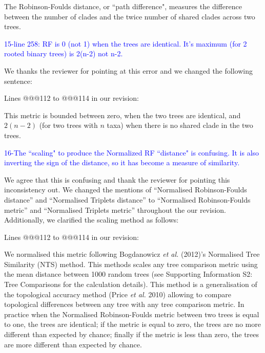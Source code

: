 \documentclass[11pt]{letter}
\begin{document}
\begin{letter}{}
\hfill\begin{minipage}{\dimexpr\textwidth-1cm}
The Robinson-Foulds distance, or ``path difference", measures the difference between the number of clades and the twice number of shared clades across two trees.
\end{minipage}


\textcolor{blue}{15-line 258: RF is 0 (not 1) when the trees are identical. It's maximum (for 2 rooted binary trees) is 2(n-2) not n-2.}

We thanks the reviewer for pointing at this error and we changed the following sentence:

Lines @@@112 to @@@114 in our revision:

\hfill\begin{minipage}{\dimexpr\textwidth-1cm}
This metric is bounded between zero, when the two trees are identical, and $2(n-2)$ (for two trees with $n$ taxa) when there is no shared clade in the two trees.
\end{minipage}



\textcolor{blue}{16-The ``scaling" to produce the Normalized RF ``distance" is confusing. It is also inverting the sign of the distance, so it has become a measure of similarity.}

We agree that this is confusing and thank the reviewer for pointing this inconsistency out. We changed the mentions of ``Normalised Robinson-Foulds distance'' and ``Normalised Triplets distance'' to ``Normalised Robinson-Foulds metric'' and ``Normalised Triplets metric'' throughout the our revision. Additionally, we clarified the scaling method as follows:

Lines @@@112 to @@@114 in our revision:

\hfill\begin{minipage}{\dimexpr\textwidth-1cm}
We normalised this metric following Bogdanowicz \textit{et al.} (2012)'s Normalised Tree Similarity (NTS) method. This methods scales %
any tree comparison metric using the mean distance between 1000 random trees (see Supporting Information S2: Tree Comparisons for the calculation details). This method is a generalisation of the topological accuracy method (Price \textit{et al.} 2010) allowing to compare topological differences between any tree with any tree comparison metric. In practice when the Normalised Robinson-Foulds metric between two trees is equal to one, the trees are identical; if the metric is equal to zero, the trees are no more different than expected by chance; finally if the metric is less than zero, the trees are more different than expected by chance.
\end{minipage}


\end{letter}
\end{document}
